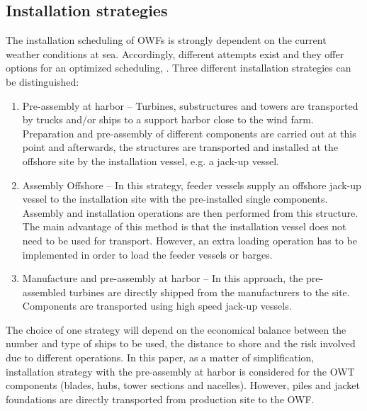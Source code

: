 \subsection{Installation strategies}
The installation scheduling of OWFs is strongly dependent on the current weather conditions at sea. Accordingly, different attempts exist and they offer options for an optimized scheduling, \cite{Thalemann2012}. Three different installation strategies can be distinguished:

\begin{enumerate}
\item Pre-assembly at harbor -- Turbines, substructures and towers are transported by trucks and/or ships to a support harbor close to the wind farm. Preparation and pre-assembly of different components are carried out at this point and afterwards, the structures are transported and installed at the offshore site by the installation vessel, e.g. a jack-up vessel.
\item Assembly Offshore -- In this strategy, feeder vessels supply an offshore jack-up vessel to the installation site with the pre-installed single components. Assembly and installation operations are then performed from this structure. The main advantage of this method is that the installation vessel does not need to be used for transport. However, an extra loading operation has to be implemented in order to load the feeder vessels or barges.
\item Manufacture and pre-assembly at harbor -- In this approach, the pre-assembled turbines are directly shipped from the manufacturers to the site. Components are transported using high speed jack-up vessels.
\end{enumerate}

The choice of one strategy will depend on the economical balance between the number and type of ships to be used, the distance to shore and the risk involved due to different operations. In this paper, as a matter of simplification, installation strategy with the pre-assembly at harbor is considered for the OWT components (blades, hubs, tower sections and nacelles). However, piles and jacket foundations are directly transported from production site to the OWF. 